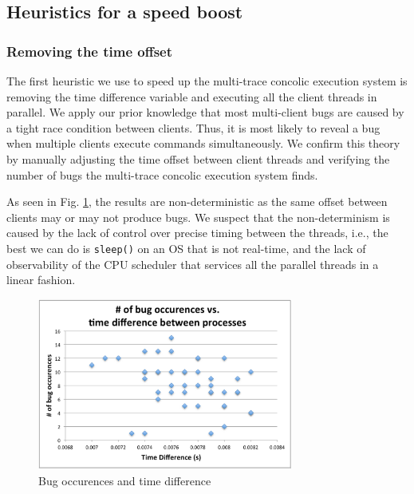 \documentclass{llncs}
\begin{document}

\subsection{Heuristics for a speed boost}

\subsubsection{Removing the time offset}

The first heuristic we use to speed up the multi-trace concolic
execution system is removing the time difference variable and
executing all the client threads in parallel. We apply our prior
knowledge that most multi-client bugs are caused by a tight race
condition between clients. Thus, it is most likely to reveal a bug
when multiple clients execute commands simultaneously. We confirm this
theory by manually adjusting the time offset between client threads
and verifying the number of bugs the multi-trace concolic execution
system finds.

As seen in Fig. \ref{fig:error}, the results are non-deterministic as
the same offset between clients may or may not produce bugs. We
suspect that the non-determinism is caused by the lack of control over
precise timing between the threads, i.e., the best we can do is
\texttt{sleep()} on an OS that is not real-time, and the lack of
observability of the CPU scheduler that services all the parallel
threads in a linear fashion.

\begin{figure}
  \begin{center}
    \includegraphics[width=0.75\textwidth]{graph.png}
  \end{center}
  \caption{Bug occurences and time difference}
  \label{fig:error}
\end{figure}
\end{document}
